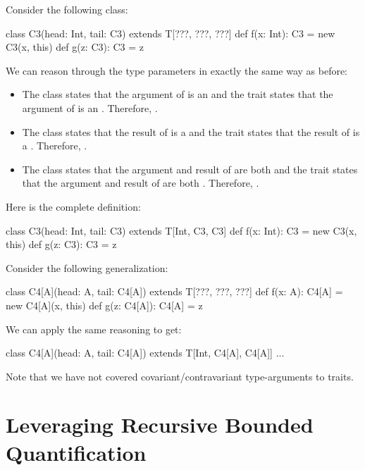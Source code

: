 \documentclass[9pt]{extbook}
\begin{document}
Consider the following class:
\begin{scalacode}
class C3(head: Int, tail: C3) extends T[???, ???, ???] {
  def f(x: Int): C3 = new C3(x, this)
  def g(z: C3): C3 = z
}
\end{scalacode}
We can reason through the type parameters in exactly the same way as before:
\begin{itemize}
  \item The class states that the argument of  is an 
  and the trait states that the argument of  is an .
  Therefore, .

  \item The class states that the result of  is a 
  and the trait states that the result of  is a .
  Therefore, .

  \item The class states that the argument and result of  are both 
  and the trait states that the argument and result of  are both .
  Therefore, .
\end{itemize}
Here is the complete definition:
\begin{scalacode}
class C3(head: Int, tail: C3) extends T[Int, C3, C3] {
  def f(x: Int): C3 = new C3(x, this)
  def g(z: C3): C3 = z
}
\end{scalacode}

Consider the following generalization:
\begin{scalacode}
class C4[A](head: A, tail: C4[A]) extends T[???, ???, ???] {
  def f(x: A): C4[A] = new C4[A](x, this)
  def g(z: C4[A]): C4[A] = z
}
\end{scalacode}

We can apply the same reasoning to get:
\begin{scalacode}
class C4[A](head: A, tail: C4[A]) extends T[Int, C4[A], C4[A]] { ... }
\end{scalacode}

\begin{instructor}
Note that we have not covered covariant/contravariant type-arguments to traits.
\end{instructor}

\section{Leveraging Recursive Bounded Quantification}
\end{document}
